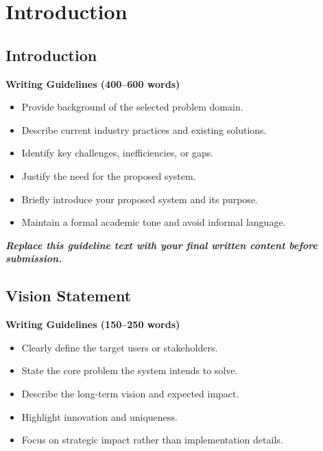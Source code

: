 
\chapter{Introduction}


\section{Introduction}

\textbf{Writing Guidelines (400–600 words)}

\begin{itemize}
    \item Provide background of the selected problem domain.
    \item Describe current industry practices and existing solutions.
    \item Identify key challenges, inefficiencies, or gaps.
    \item Justify the need for the proposed system.
    \item Briefly introduce your proposed system and its purpose.
    \item Maintain a formal academic tone and avoid informal language.
\end{itemize}

\vspace{0.5cm}

\textbf{\textit{Replace this guideline text with your final written content before submission.}}




\section{Vision Statement}

\textbf{Writing Guidelines (150–250 words)}

\begin{itemize}
    \item Clearly define the target users or stakeholders.
    \item State the core problem the system intends to solve.
    \item Describe the long-term vision and expected impact.
    \item Highlight innovation and uniqueness.
    \item Focus on strategic impact rather than implementation details.
\end{itemize}

